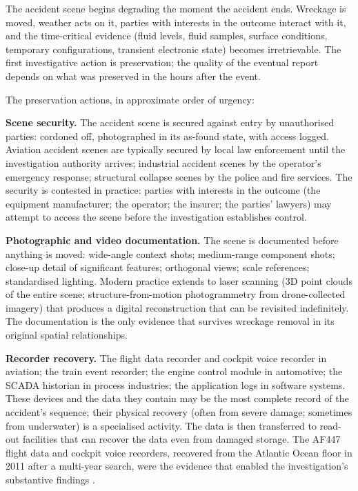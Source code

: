 The accident scene begins degrading the moment the accident ends. Wreckage is moved, weather acts on it, parties with interests in the outcome interact with it, and the time-critical evidence (fluid levels, fluid samples, surface conditions, temporary configurations, transient electronic state) becomes irretrievable. The first investigative action is preservation; the quality of the eventual report depends on what was preserved in the hours after the event.

The preservation actions, in approximate order of urgency:

\textbf{Scene security.} The accident scene is secured against entry by unauthorised parties: cordoned off, photographed in its as-found state, with access logged. Aviation accident scenes are typically secured by local law enforcement until the investigation authority arrives; industrial accident scenes by the operator's emergency response; structural collapse scenes by the police and fire services. The security is contested in practice: parties with interests in the outcome (the equipment manufacturer; the operator; the insurer; the parties' lawyers) may attempt to access the scene before the investigation establishes control.

\textbf{Photographic and video documentation.} The scene is documented before anything is moved: wide-angle context shots; medium-range component shots; close-up detail of significant features; orthogonal views; scale references; standardised lighting. Modern practice extends to laser scanning (3D point clouds of the entire scene; structure-from-motion photogrammetry from drone-collected imagery) that produces a digital reconstruction that can be revisited indefinitely. The documentation is the only evidence that survives wreckage removal in its original spatial relationships.

\textbf{Recorder recovery.} The flight data recorder and cockpit voice recorder in aviation; the train event recorder; the engine control module in automotive; the SCADA historian in process industries; the application logs in software systems. These devices and the data they contain may be the most complete record of the accident's sequence; their physical recovery (often from severe damage; sometimes from underwater) is a specialised activity. The data is then transferred to read-out facilities that can recover the data even from damaged storage. The AF447 flight data and cockpit voice recorders, recovered from the Atlantic Ocean floor in 2011 after a multi-year search, were the evidence that enabled the investigation's substantive findings \cite{acc:bea-af447}.

